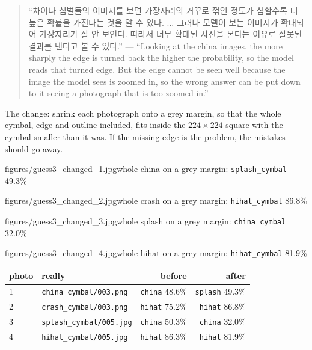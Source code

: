 \documentclass[11pt]{article}
\begin{document}
\begin{quote}
“차이나 심벌들의 이미지를 보면 가장자리의 거꾸로 꺾인 정도가 심할수록 더 높은
확률을 가진다는 것을 알 수 있다. ... 그러나 모델이 보는 이미지가 확대되어
가장자리가 잘 안 보인다. 따라서 너무 확대된 사진을 본다는 이유로 잘못된 결과를
낸다고 볼 수 있다.” --- ``Looking at the china images, the more sharply the edge
is turned back the higher the probability, so the model reads that turned edge.
But the edge cannot be seen well because the image the model sees is zoomed in,
so the wrong answer can be put down to it seeing a photograph that is too zoomed
in.''
\end{quote}

The change: shrink each photograph onto a grey margin, so that the whole cymbal,
edge and outline included, fits inside the $224 \times 224$ square with the
cymbal smaller than it was. If the missing edge is the problem, the mistakes
should go away.

{figures/guess3_changed_1.jpg}{whole china on a grey margin:
\texttt{splash\_cymbal} 49.3\%}

{figures/guess3_changed_2.jpg}{whole crash on a grey margin:
\texttt{hihat\_cymbal} 86.8\%}

{figures/guess3_changed_3.jpg}{whole splash on a grey margin:
\texttt{china\_cymbal} 32.0\%}

{figures/guess3_changed_4.jpg}{whole hihat on a grey margin:
\texttt{hihat\_cymbal} 81.9\%}

\begin{center}\footnotesize
\begin{tabular}{llrr}
\toprule
photo & really & before & after \\
\midrule
1 & \texttt{china\_cymbal/003.png}  & \texttt{china} 48.6\% & \texttt{splash} 49.3\% \\
2 & \texttt{crash\_cymbal/003.png}  & \texttt{hihat} 75.2\% & \texttt{hihat} 86.8\% \\
3 & \texttt{splash\_cymbal/005.jpg} & \texttt{china} 50.3\% & \texttt{china} 32.0\% \\
4 & \texttt{hihat\_cymbal/005.jpg}  & \texttt{hihat} 86.3\% & \texttt{hihat} 81.9\% \\
\bottomrule
\end{tabular}
\end{center}
\end{document}
